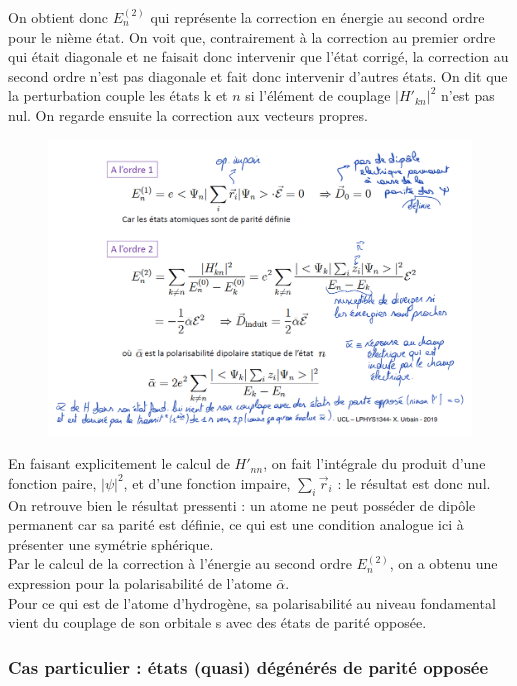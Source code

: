 On obtient donc $E_n^{(2)}$ qui représente la correction en énergie au second ordre pour le nième état. On voit que, contrairement à la correction au premier ordre qui était diagonale et ne faisait donc intervenir que l'état corrigé, la correction au second ordre n'est pas diagonale et fait donc intervenir d'autres états. On dit que la perturbation couple les états k et $n$ si l'élément de couplage $|H'_{kn}|^2$ n'est pas nul. On regarde ensuite la correction aux vecteurs propres.\\

\begin{figure}[tph]
    \centering
    \includegraphics[scale=0.65]{Images2/ordre2.2.PNG}
\end{figure}

En faisant explicitement le calcul de $H'_{nn}$, on fait l'intégrale du produit d'une fonction paire, $|\psi|^2$, et d'une fonction impaire, $\sum_i \vec{r}_i$ : le résultat est donc nul. On retrouve bien le résultat pressenti : un atome ne peut posséder de dipôle permanent car sa parité est définie, ce qui est une condition analogue ici à présenter une symétrie sphérique.\\

Par le calcul de la correction à l'énergie au second ordre $E_n^{(2)}$, on a obtenu une expression pour la polarisabilité de l'atome $\bar{\alpha}$.\\
Pour ce qui est de l'atome d'hydrogène, sa polarisabilité au niveau fondamental vient du couplage de son orbitale s avec des états de parité opposée.



    \subsubsection{Cas particulier : états (quasi) dégénérés de parité opposée}



